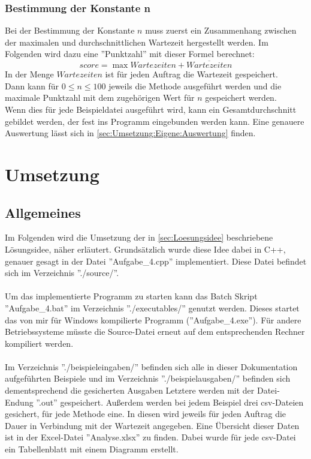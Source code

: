 \documentclass[a4paper,10pt,ngerman]{scrartcl}
\begin{document}
        \subsubsection{Bestimmung der Konstante n\label{sec:Loesungsidee:n}}
          Bei der Bestimmung der Konstante $n$ muss zuerst ein Zusammenhang zwischen der maximalen und durchschnittlichen Wartezeit hergestellt werden. Im Folgenden wird dazu eine ''Punktzahl'' mit dieser Formel berechnet:
          \begin{equation}
            score = \max{Wartezeiten} + \overline{Wartezeiten}
          \end{equation}
          In der Menge $Wartezeiten$ ist für jeden Auftrag die Wartezeit gespeichert.\\
          Dann kann für $0\leq n\leq 100$ jeweils die Methode ausgeführt werden und die maximale Punktzahl mit dem zugehörigen Wert für $n$ gespeichert werden.\\
          Wenn dies für jede Beispieldatei ausgeführt wird, kann ein Gesamtdurchschnitt gebildet werden, der fest ins Programm eingebunden werden kann. Eine genauere Auswertung lässt sich in \cref{sec:Umsetzung:Eigene:Auswertung} finden.
  \section{Umsetzung}
    \subsection{Allgemeines}
      Im Folgenden wird die Umsetzung der in \cref{sec:Loesungsidee} beschriebene Lösungsidee, näher erläutert.  Grundsätzlich wurde diese Idee dabei in C++, genauer gesagt in der Datei ''Aufgabe\_4.cpp'' implementiert. Diese Datei befindet sich im Verzeichnis ''./source/''.
      \\\\
      Um das implementierte Programm zu starten kann das Batch Skript ''Aufgabe\_4.bat'' im Verzeichnis ''./executables/'' genutzt werden. Dieses startet das von mir für Windows kompilierte Programm (''Aufgabe\_4.exe''). Für andere Betriebssysteme müsste die Source-Datei erneut auf dem entsprechenden Rechner kompiliert werden.
      \\\\
      Im Verzeichnis ''./beispieleingaben/'' befinden sich alle in dieser Dokumentation aufgeführten Beispiele und im Verzeichnis ''./beispielausgaben/'' befinden sich dementsprechend die gesicherten Ausgaben Letztere werden mit der Datei-Endung ''.out'' gespeichert. Außerdem werden bei jedem Beispiel drei csv-Dateien gesichert, für jede Methode eine. In diesen wird jeweils für jeden Auftrag die Dauer in Verbindung mit der Wartezeit angegeben. Eine Übersicht dieser Daten ist in der Excel-Datei ''Analyse.xlsx'' zu finden. Dabei wurde für jede csv-Datei ein Tabellenblatt mit einem Diagramm erstellt.
\end{document}
